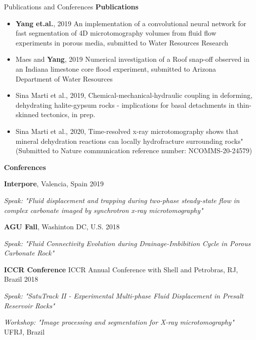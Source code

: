 \documentclass{resume} %
\newenvironment{indentpar}[1]%
  {\begin{list}{}%
          {\setlength{\leftmargin}{#1}}%
          \item[]%
  }
  {\end{list}}
\begin{document}
\begin{rSection}{Publications and Conferences}
\textbf{Publications}
\begin{indentpar}{0.5cm}
\begin{itemize}
    \item \textbf{Yang et.al.}, 2019 An implementation of a convolutional neural network for fast segmentation of 4D microtomography volumes from fluid flow experiments in porous media, submitted to Water Resources Research
    \item Maes and \textbf{Yang}, 2019 Numerical investigation of a Roof snap-off observed in an Indiana limestone core flood experiment, submitted to Arizona Department of Water Resources
    \item Sina Marti et al., 2019, Chemical-mechanical-hydraulic coupling in deforming, dehydrating halite-gypsum rocks - implications for basal detachments in thin-skinned tectonics, in prep.
    \item Sina Marti et al., 2020, Time-resolved x-ray microtomography shows that mineral dehydration reactions can locally hydrofracture surrounding rocks" (Submitted to Nature communication reference number: NCOMMS-20-24579)
\end{itemize}
\end{indentpar}

\textbf{Conferences}
\begin{indentpar}{0.5cm}
\textbf{Interpore}, Valencia, Spain \hfill {2019}
\begin{indentpar}{0.5cm}
\textit {Speak: "Fluid displacement and trapping during two-phase steady-state flow in complex carbonate imaged by synchrotron x-ray microtomography"}
\end{indentpar}

\textbf{AGU Fall}, Washinton DC, U.S. \hfill {2018}
\begin{indentpar}{0.5cm}
\textit {Speak: "Fluid Connectivity Evolution during Drainage-Imbibition Cycle in Porous Carbonate Rock"}
\end{indentpar}

\textbf{ICCR Conference} ICCR Annual Conference with Shell and Petrobras, RJ, Brazil \hfill {2018}
\begin{indentpar}{0.5cm}
\textit {Speak: "SatuTrack II - Experimental Multi-phase Fluid Displacement in Presalt Reservoir Rocks"}

\textit {Workshop: "Image processing and segmentation for X-ray microtomography"} UFRJ, Brazil
\end{indentpar}


\end{indentpar}
\end{rSection}
\end{document}
